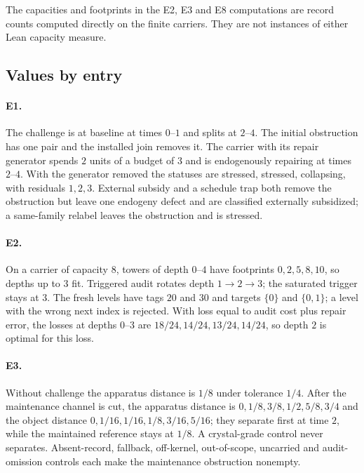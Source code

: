 The capacities and footprints in the E2, E3 and E8 computations are record counts computed
directly on the finite carriers. They are not instances of either Lean capacity measure.

\subsection{Values by entry}

\paragraph{E1.} The challenge is at baseline at times $0$--$1$ and splits at $2$--$4$. The initial
obstruction has one pair and the installed join removes it. The carrier with its repair generator
spends $2$ units of a budget of $3$ and is endogenously repairing at times $2$--$4$. With the
generator removed the statuses are stressed, stressed, collapsing, with residuals $1, 2, 3$. External
subsidy and a schedule trap both remove the obstruction but leave one endogeny defect and are
classified externally subsidized; a same-family relabel leaves the obstruction and is stressed.

\paragraph{E2.} On a carrier of capacity $8$, towers of depth $0$--$4$ have footprints
$0, 2, 5, 8, 10$, so depths up to $3$ fit. Triggered audit rotates depth $1 \to 2 \to 3$; the
saturated trigger stays at $3$. The fresh levels have tags $20$ and $30$ and targets $\{0\}$ and
$\{0, 1\}$; a level with the wrong next index is rejected. With loss equal to audit cost plus repair
error, the losses at depths $0$--$3$ are $18/24, 14/24, 13/24, 14/24$, so depth $2$ is optimal for
this loss.

\paragraph{E3.} Without challenge the apparatus distance is $1/8$ under tolerance $1/4$. After the
maintenance channel is cut, the apparatus distance is $0, 1/8, 3/8, 1/2, 5/8, 3/4$ and the object
distance $0, 1/16, 1/16, 1/8, 3/16, 5/16$; they separate first at time $2$, while the maintained
reference stays at $1/8$. A crystal-grade control never separates. Absent-record, fallback,
off-kernel, out-of-scope, uncarried and audit-omission controls each make the maintenance
obstruction nonempty.

